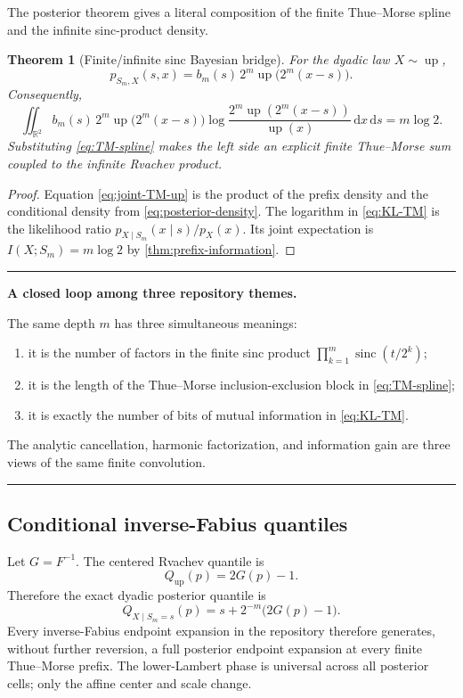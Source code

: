 \documentclass[11pt,oneside]{article}
\newtheorem{theorem}{Theorem}[section]
\theoremstyle{definition}
\theoremstyle{remark}
\newcommand{\R}{\mathbb R}
\newcommand{\sinc}{\operatorname{sinc}}
\newcommand{\Up}{\operatorname{up}}
\newcommand{\dd}{\,\mathrm d}
\newenvironment{resultbox}[1][Frontier result]{%
  \par\medskip\noindent
  \begin{center}\begin{minipage}{0.94\textwidth}
  \color{black}\hrule\vspace{0.55em}
  \textbf{#1.}\quad
}{%
  \vspace{0.55em}\hrule
  \end{minipage}\end{center}\medskip
}
\begin{document}
The posterior theorem gives a literal composition of the finite Thue--Morse
spline and the infinite sinc-product density.

\begin{theorem}[Finite/infinite sinc Bayesian bridge]
\label{thm:KL-TM}
For the dyadic law $X\sim\Up$,
\begin{equation}
 p_{S_m,X}(s,x)
 =b_m(s)\,2^m\Up\bigl(2^m(x-s)\bigr).
 \label{eq:joint-TM-up}
\end{equation}
Consequently,
\begin{equation}
 \boxed{
 \iint_{\R^2} b_m(s)\,2^m\Up\bigl(2^m(x-s)\bigr)
 \log\frac{2^m\Up(2^m(x-s))}{\Up(x)}\dd x\dd s
 =m\log2.}
 \label{eq:KL-TM}
\end{equation}
Substituting \eqref{eq:TM-spline} makes the left side an explicit finite
Thue--Morse sum coupled to the infinite Rvachev product.
\end{theorem}

\begin{proof}
Equation \eqref{eq:joint-TM-up} is the product of the prefix density and the
conditional density from \eqref{eq:posterior-density}.  The logarithm in
\eqref{eq:KL-TM} is the likelihood ratio
$p_{X\mid S_m}(x\mid s)/p_X(x)$.  Its joint expectation is
$I(X;S_m)=m\log2$ by \cref{thm:prefix-information}.
\end{proof}

\begin{resultbox}[A closed loop among three repository themes]
The same depth $m$ has three simultaneous meanings:
\begin{enumerate}
\item it is the number of factors in the finite sinc product
      $\prod_{k=1}^m\sinc(t/2^k)$;
\item it is the length of the Thue--Morse inclusion-exclusion block in
      \eqref{eq:TM-spline};
\item it is exactly the number of bits of mutual information in
      \eqref{eq:KL-TM}.
\end{enumerate}
The analytic cancellation, harmonic factorization, and information gain are three
views of the same finite convolution.
\end{resultbox}

\subsection{Conditional inverse-Fabius quantiles}

Let $G=F^{-1}$.  The centered Rvachev quantile is
\begin{equation}
 Q_{\Up}(p)=2G(p)-1.
 \label{eq:up-quantile}
\end{equation}
Therefore the exact dyadic posterior quantile is
\begin{equation}
 Q_{X\mid S_m=s}(p)
 =s+2^{-m}\bigl(2G(p)-1\bigr).
 \label{eq:posterior-G}
\end{equation}
Every inverse-Fabius endpoint expansion in the repository therefore generates,
without further reversion, a full posterior endpoint expansion at every finite
Thue--Morse prefix.  The lower-Lambert phase is universal across all posterior
cells; only the affine center and scale change.
\end{document}
